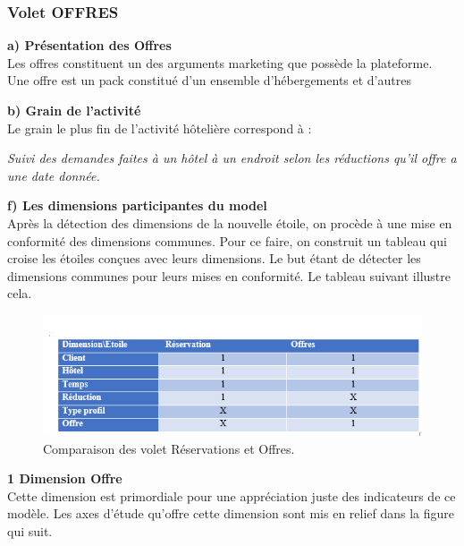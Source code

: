  \subsubsection{Volet OFFRES}
\textbf{a)	Présentation des Offres}\\

Les offres constituent un des arguments marketing que possède la plateforme. Une offre est un pack constitué d’un ensemble d’hébergements et d’autres 

\textbf{b)	Grain de l’activité}\\
Le grain le plus fin de l’activité hôtelière correspond à : 
\begin{center}
\textit{Suivi des demandes faites à un hôtel à un endroit selon les réductions qu’il offre a une date donnée.}
\end{center}
\cleardoublepage
\textbf{f)	Les dimensions participantes du model}\\

Après la détection des dimensions de la nouvelle étoile, on procède à une mise en conformité des dimensions communes. Pour ce faire, on construit un tableau qui croise les étoiles conçues avec leurs dimensions. Le but étant de détecter les dimensions communes pour leurs mises en conformité. Le tableau suivant illustre cela.

\begin{figure}[!htbp]
	\begin{center}
		\includegraphics[scale=0.95]{images/tab_conform.png}
		\caption{Comparaison des volet Réservations et Offres.}
		\label{use_bi_tools}
	\end{center}
	\end{figure}

\textbf{1 Dimension Offre}\\
 Cette dimension est primordiale pour une appréciation juste des indicateurs de ce modèle. Les axes d’étude qu’offre cette dimension sont mis en relief dans la figure qui suit. 


